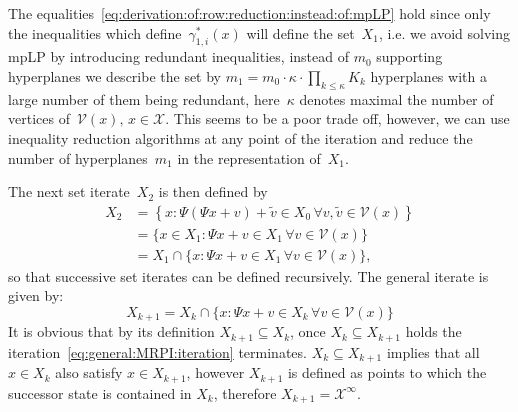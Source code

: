 %
The equalities~\eqref{eq:derivation:of:row:reduction:instead:of:mpLP} hold since only the 
inequalities which define~$\gamma_{1,i}^\ast(x)$ will define the set~$X_1$, i.e. we avoid
solving mpLP by introducing redundant inequalities, instead of $m_0$ supporting hyperplanes
we describe the set by $m_1 = m_0\cdot \kappa\cdot \prod_{k\leq \kappa} K_k$ hyperplanes with
a large number of them being redundant, here~$\kappa$ denotes maximal the number of vertices 
of~$\mathcal V(x),\,x\in\mathscr X$.
%
This seems to be a poor trade off, however, we can use inequality reduction algorithms at any
point of the iteration and reduce the number of hyperplanes~$m_1$ in the representation of~$X_1$.

The next set iterate~$X_2$ is then defined by
%
\begin{equation}
	\begin{split}
	X_2 &= \left\{x: \Psi (\Psi x + v) + \tilde v\in X_0\,\forall v,\tilde v\in\mathcal V(x) \right\}\\
	&= \{x\in X_1 : \Psi x + v \in X_1\,\forall v\in\mathcal V(x)\}\\
	&= X_1 \cap \{x: \Psi x + v \in X_1\,\forall v\in\mathcal V(x)\},
	\end{split}
\end{equation}
%
so that successive set iterates can be defined recursively.
%
The general iterate is given by:
%
\begin{equation}\label{eq:general:MRPI:iteration}
	X_{k+1} = X_k \cap \{x:\Psi x + v\in X_k\, \forall v\in\mathcal V(x)\}
\end{equation}
%
It is obvious that by its definition $X_{k+1}\subseteq X_k$, once $X_k\subseteq X_{k+1}$ holds
the iteration~\eqref{eq:general:MRPI:iteration} terminates.
%
$X_k\subseteq X_{k+1}$ implies that all $x\in X_k$ also satisfy $x\in X_{k+1}$, however
$X_{k+1}$ is defined as points to which the successor state is contained in $X_k$, therefore
$X_{k+1} = \mathcal X^\infty$. 

